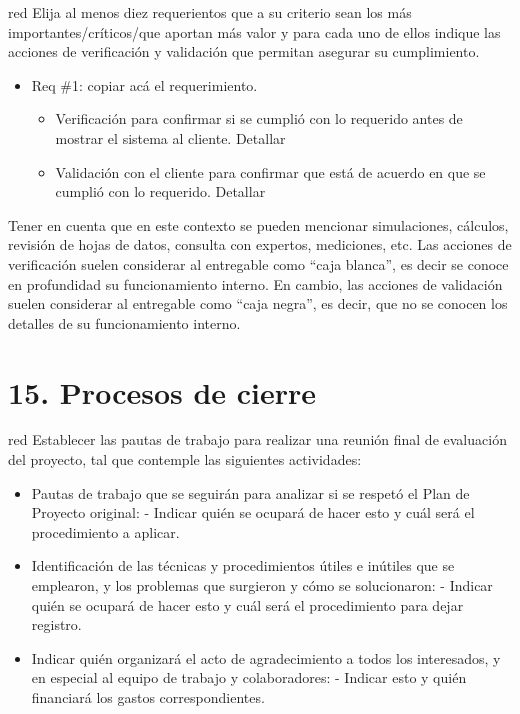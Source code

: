 \documentclass[
11pt, %
]{charter}
\begin{document}
\begin{consigna}{red}
Elija al menos diez requerientos que a su criterio sean los más importantes/críticos/que aportan más valor y para cada uno de ellos indique las acciones de verificación y validación que permitan asegurar su cumplimiento.

\begin{itemize} 
\item Req \#1: copiar acá el requerimiento.

\begin{itemize}
	\item Verificación para confirmar si se cumplió con lo requerido antes de mostrar el sistema al cliente. Detallar 
	\item Validación con el cliente para confirmar que está de acuerdo en que se cumplió con lo requerido. Detallar  
\end{itemize}

\end{itemize}

Tener en cuenta que en este contexto se pueden mencionar simulaciones, cálculos, revisión de hojas de datos, consulta con expertos, mediciones, etc.  Las acciones de verificación suelen considerar al entregable como ``caja blanca'', es decir se conoce en profundidad su funcionamiento interno.  En cambio, las acciones de validación suelen considerar al entregable como ``caja negra'', es decir, que no se conocen los detalles de su funcionamiento interno.

\end{consigna}

\section{15. Procesos de cierre}    
\label{sec:cierre}

\begin{consigna}{red}
Establecer las pautas de trabajo para realizar una reunión final de evaluación del proyecto, tal que contemple las siguientes actividades:

\begin{itemize}
	\item Pautas de trabajo que se seguirán para analizar si se respetó el Plan de Proyecto original:
	 - Indicar quién se ocupará de hacer esto y cuál será el procedimiento a aplicar. 
	\item Identificación de las técnicas y procedimientos útiles e inútiles que se emplearon, y los problemas que surgieron y cómo se solucionaron:
	 - Indicar quién se ocupará de hacer esto y cuál será el procedimiento para dejar registro.
	\item Indicar quién organizará el acto de agradecimiento a todos los interesados, y en especial al equipo de trabajo y colaboradores:
	  - Indicar esto y quién financiará los gastos correspondientes.
\end{itemize}

\end{consigna}
\end{document}
